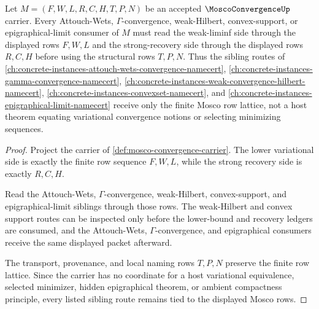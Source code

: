 \begin{theorem}
\label{thm:mosco-convergence-attouch-wets-variational-lattice-route}
Let $M=(F,W,L,R,C,H,T,P,N)$ be an accepted $\MoscoConvergenceUp$ carrier.
Every Attouch-Wets, $\Gamma$-convergence, weak-Hilbert, convex-support, or
epigraphical-limit consumer of $M$ must read the weak-liminf side through the
displayed rows $F,W,L$ and the strong-recovery side through the displayed rows
$R,C,H$ before using the structural rows $T,P,N$. Thus the sibling routes of
\autoref{ch:concrete-instances-attouch-wets-convergence-namecert},
\autoref{ch:concrete-instances-gamma-convergence-namecert},
\autoref{ch:concrete-instances-weak-convergence-hilbert-namecert},
\autoref{ch:concrete-instances-convexset-namecert}, and
\autoref{ch:concrete-instances-epigraphical-limit-namecert} receive only the
finite Mosco row lattice, not a host theorem equating variational convergence
notions or selecting minimizing sequences.
\end{theorem}
\begin{proof}
Project the carrier of \autoref{def:mosco-convergence-carrier}. The lower
variational side is exactly the finite row sequence $F,W,L$, while the strong
recovery side is exactly $R,C,H$.

Read the Attouch-Wets, $\Gamma$-convergence, weak-Hilbert, convex-support, and
epigraphical-limit siblings through those rows. The weak-Hilbert and convex
support routes can be inspected only before the lower-bound and recovery
ledgers are consumed, and the Attouch-Wets, $\Gamma$-convergence, and
epigraphical consumers receive the same displayed packet afterward.

The transport, provenance, and local naming rows $T,P,N$ preserve the finite
row lattice. Since the carrier has no coordinate for a host variational
equivalence, selected minimizer, hidden epigraphical theorem, or ambient
compactness principle, every listed sibling route remains tied to the
displayed Mosco rows.
\end{proof}
